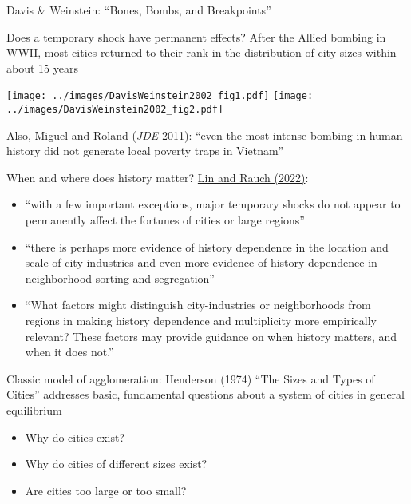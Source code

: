 \documentclass[11pt,notes=hide,aspectratio=169]{beamer}
\begin{document}
\begin{frame}{Davis \& Weinstein: ``Bones, Bombs, and Breakpoints''}
{\small Does a temporary shock have permanent effects? After the Allied bombing in WWII, most cities returned to their rank in the distribution of city sizes within about 15 years \par}
\texttt{[image: ../images/DavisWeinstein2002\_fig1.pdf]}
\texttt{[image: ../images/DavisWeinstein2002\_fig2.pdf]}\\
{Also, \href{https://www.sciencedirect.com/science/article/pii/S0304387810000817}{Miguel and Roland (\textit{JDE} 2011)}: ``even the most intense bombing in human history did not generate local poverty traps in Vietnam''\par}
\end{frame}
\begin{frame}{When and where does history matter?}
\href{https://doi.org/10.1016/j.regsciurbeco.2020.103628}{Lin and Rauch (2022)}:
\begin{itemize}
\item ``with a few important exceptions, major temporary shocks do not appear to permanently affect the fortunes of cities or large regions''
\item ``there is perhaps more evidence of history dependence in the location and scale of city-industries and even more evidence of history dependence in neighborhood sorting and segregation''
\item ``What factors might distinguish city-industries or neighborhoods from regions in making history dependence and multiplicity more empirically relevant?
These factors may provide guidance on when history matters, and when it does not.''
\end{itemize}
\end{frame}
\begin{frame}{Classic model of agglomeration: Henderson (1974)}
``The Sizes and Types of Cities'' addresses basic, fundamental questions about a system of cities in general equilibrium
\begin{itemize}
\item Why do cities exist? 
\item Why do cities of different sizes exist?
\item Are cities too large or too small?
\end{itemize}
\end{frame}
\end{document}
